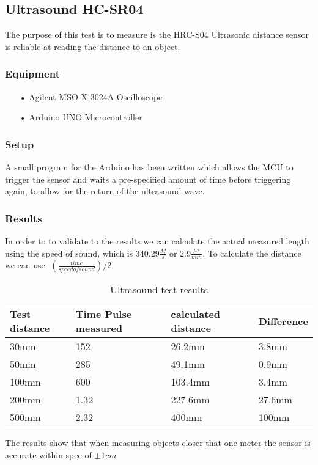 \subsection{Ultrasound HC-SR04}
The purpose of this test is to measure is the HRC-S04 Ultrasonic distance sensor is reliable at reading the distance to an object.

\subsubsection{Equipment}

\begin{enumerate}
    \item[•]Agilent MSO-X 3024A Oscilloscope 
    \item[•]Arduino UNO Microcontroller  
\end{enumerate}

\subsubsection{Setup}
A small program for the Arduino has been written which allows the MCU to trigger the sensor and waits a pre-specified amount of time before triggering again, to allow for the return of the ultrasound wave. 

\subsubsection{Results}
In order to to validate to the results we can calculate the actual measured length using the speed of sound, which is $ 340.29 \frac{M}{s} $ or $2.9\frac{\mu s}{mm}$. To calculate the distance we can use: $(\frac{time}{speed of sound})/2$ \cite{SOF}
\begin{table}[h]
\centering
\label{ultrasoundtestresults}
\begin{tabular}{|l|l|l|l|}
\hline
\textbf{Test distance} & \textbf{Time Pulse measured} & \textbf{calculated  distance} & \textbf{Difference} \\ \hline
30mm          & 152                 & 26.2mm               & 3.8mm      \\ \hline
50mm          & 285                 & 49.1mm               & 0.9mm      \\ \hline
100mm         & 600                 & 103.4mm              & 3.4mm      \\ \hline
200mm         & 1.32                & 227.6mm              & 27.6mm     \\ \hline
500mm         & 2.32                & 400mm                & 100mm      \\ \hline
\end{tabular}
\caption{Ultrasound test results}
\end{table}

The results show that when measuring objects closer that one meter the sensor is accurate within spec of $\pm 1cm$